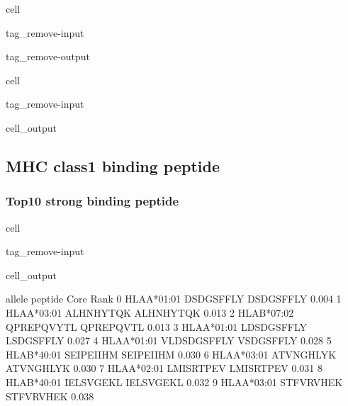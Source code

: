 \documentclass[letterpaper,10pt,english]{jupyterBook}
\begin{document}
\begin{sphinxuseclass}{cell}
\begin{sphinxuseclass}{tag_remove-input}
\begin{sphinxuseclass}{tag_remove-output}
\end{sphinxuseclass}
\end{sphinxuseclass}
\end{sphinxuseclass}
\begin{sphinxuseclass}{cell}
\begin{sphinxuseclass}{tag_remove-input}\begin{sphinxVerbatimOutput}

\begin{sphinxuseclass}{cell_output}
\noindent{}

\end{sphinxuseclass}\end{sphinxVerbatimOutput}

\end{sphinxuseclass}
\end{sphinxuseclass}

\subsection{MHC class1 binding peptide}
\label{\detokenize{ipynb/chapter4:mhc-class1-binding-peptide}}

\subsubsection{Top10 strong binding peptide}
\label{\detokenize{ipynb/chapter4:top10-strong-binding-peptide}}
\begin{sphinxuseclass}{cell}
\begin{sphinxuseclass}{tag_remove-input}\begin{sphinxVerbatimOutput}

\begin{sphinxuseclass}{cell_output}
\begin{sphinxVerbatim}[commandchars=\\\{\}]
        allele      peptide       Core   Rank
0  HLA\PYGZhy{}A*01:01    DSDGSFFLY  DSDGSFFLY  0.004
1  HLA\PYGZhy{}A*03:01    ALHNHYTQK  ALHNHYTQK  0.013
2  HLA\PYGZhy{}B*07:02   QPREPQVYTL  QPREPQVTL  0.013
3  HLA\PYGZhy{}A*01:01   LDSDGSFFLY  LSDGSFFLY  0.027
4  HLA\PYGZhy{}A*01:01  VLDSDGSFFLY  VSDGSFFLY  0.028
5  HLA\PYGZhy{}B*40:01    SEIPEIIHM  SEIPEIIHM  0.030
6  HLA\PYGZhy{}A*03:01    ATVNGHLYK  ATVNGHLYK  0.030
7  HLA\PYGZhy{}A*02:01    LMISRTPEV  LMISRTPEV  0.031
8  HLA\PYGZhy{}B*40:01    IELSVGEKL  IELSVGEKL  0.032
9  HLA\PYGZhy{}A*03:01    STFVRVHEK  STFVRVHEK  0.038
\end{sphinxVerbatim}

\end{sphinxuseclass}\end{sphinxVerbatimOutput}

\end{sphinxuseclass}
\end{sphinxuseclass}
\end{document}
